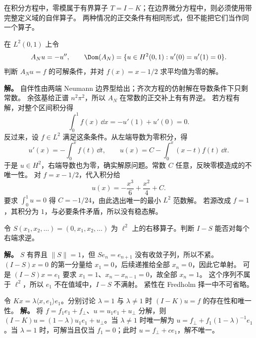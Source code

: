 在积分方程中，零模属于有界算子 $T=I-K$；在边界微分方程中，则必须使用带完整定义域的自伴算子。
两种情况的正交条件有相同形式，但不能把它们当作同一个算子。

\begin{workedexample}
在 $L^2(0,1)$ 上令
\[
A_Nu=-u'',\qquad
\Dom(A_N)=\{u\in H^2(0,1):u'(0)=u'(1)=0\}.
\]
判断 $A_Nu=f$ 的可解条件，并对 $f(x)=x-1/2$ 求平均值为零的解。

\textbf{解。} 自伴性由两端 Neumann 边界型给出；齐次方程的仿射解在导数条件下只剩常数。
余弦基给正谱 $n^2\pi^2$，所以 $A_N$ 在常数的正交补上有有界逆。
若方程有解，对整个区间积分得
\[
\int_0^1f(x)\,\dd x=-u'(1)+u'(0)=0.
\]
反过来，设 $f\in L^2$ 满足这条条件。从左端导数为零积分，得
\[
u'(x)=-\int_0^xf(t)\,\dd t,\qquad
u(x)=C-\int_0^x(x-t)f(t)\,\dd t.
\]
于是 $u\in H^2$，右端导数也为零，确实解原问题。常数 $C$ 任意，反映零模造成的不唯一性。
对 $f=x-1/2$，代入积分给
\[
u(x)=-\frac{x^3}{6}+\frac{x^2}{4}+C.
\]
要求 $\int_0^1u=0$ 得 $C=-1/24$，由此选出唯一的最小 $L^2$ 范数解。
若源改成 $f=1$，其积分为 $1$，与必要条件矛盾，所以没有稳态解。
\end{workedexample}

\begin{workedexample}[去掉紧性以后单射为何不能保证满射]
令 $S(x_1,x_2,\ldots)=(0,x_1,x_2,\ldots)$ 为 $\ell^2$ 上的右移算子。判断 $I-S$ 能否对每个右端求逆。

\textbf{解。} $S$ 有界且 $\|S\|=1$，但 $Se_n=e_{n+1}$ 没有收敛子列，所以不紧。
$(I-S)x=0$ 的第一分量给 $x_1=0$，后续递推给全部 $x_n=0$，因此它单射。
可是 $(I-S)x=e_1$ 要求 $x_1=1$、$x_n-x_{n-1}=0$，故全部 $x_n=1$。
这个序列不属于 $\ell^2$，所以 $e_1$ 不在值域中，$I-S$ 不满射。
紧性在 Fredholm 择一中不可省略。
\end{workedexample}



\par
\begin{workedexample}[秩一共振参数与解的存在唯一性]
令 \(Kx=\lambda\langle x,e_1\rangle e_1\)。分别讨论 \(\lambda=1\) 与 \(\lambda\ne1\) 时 \((I-K)u=f\) 的存在性和唯一性。
\textbf{解。} 将 \(f=f_1e_1+f_\perp\)、\(u=u_1e_1+u_\perp\) 分解，则 \((I-K)u=(1-\lambda)u_1e_1+u_\perp\)。当 \(\lambda\ne1\) 时唯一解为 \(u=f_\perp+f_1(1-\lambda)^{-1}e_1\)。当 \(\lambda=1\) 时，可解当且仅当 \(f_1=0\)；此时 \(u=f_\perp+ce_1\)，解不唯一。
\end{workedexample}
\par

